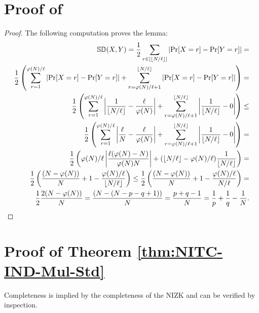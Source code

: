 \section{Proof of  }\label{proof:smpl-lemma}
\primelemma*


\begin{proof}
The following computation proves the lemma:
\begin{align*}
\mathbb{SD}(X, Y) = \frac{1}{2} \sum_{r \in [\left\lfloor N/\ell \right\rfloor]} \left| \Pr[X = r] - \Pr[Y = r] \right| = \\ 
\frac{1}{2} \left( \sum_{r = 1}^{\varphi(N)/\ell} \left| \Pr[X = r] - \Pr[Y = r] \right| + \sum_{r = \varphi(N)/\ell+1}^{\left\lfloor N/\ell \right\rfloor} \left| \Pr[X = r] - \Pr[Y = r] \right| \right) = 
\\
\frac{1}{2} \left( \sum_{r = 1}^{\varphi(N)/\ell} \left| \frac{1}{\left\lfloor N/\ell \right\rfloor} - \frac{\ell}{\varphi(N)} \right| + \sum_{r = \varphi(N)/\ell+1}^{\left\lfloor N/\ell \right\rfloor} \left| \frac{1}{\left\lfloor N/\ell \right\rfloor} - 0 \right| \right) \leq \\
\frac{1}{2} \left( \sum_{r = 1}^{\varphi(N)/\ell} \left| \frac{\ell}{N} - \frac{\ell}{\varphi(N)} \right| + \sum_{r = \varphi(N)/\ell+1}^{\left\lfloor N/\ell \right\rfloor} \left| \frac{1}{\left\lfloor N/\ell \right\rfloor} - 0 \right| \right) = \\
\frac{1}{2} \left( \varphi(N)/\ell \left| \frac{\ell(\varphi(N) - N)}{\varphi(N)N} \right| + (\left\lfloor N/\ell \right\rfloor-\varphi(N)/\ell) \frac{1}{\left\lfloor N/\ell \right\rfloor} \right) = \\
 \frac{1}{2} \left(\frac{(N-\varphi(N))}{N} + 1 - \frac{\varphi(N)/\ell}{{\left\lfloor N/\ell \right\rfloor}} \right) \leq 
\frac{1}{2} \left(\frac{(N-\varphi(N))}{N} + 1 - \frac{\varphi(N)/\ell}{{N/\ell}} \right) = \\
 \frac{1}{2}\frac{2(N-\varphi(N))}{N} = 
\frac{(N-(N-p-q+1))}{N} = \frac{p+q-1}{N} = \frac{1}{p}+\frac{1}{q}-\frac{1}{N}.
\end{align*}
\end{proof}



\section{Proof of Theorem \ref{thm:NITC-IND-Mul-Std}} %
\label{app:NITC-IND-Mul-Std}


Completeness is implied by the completeness of the NIZK and can be verified by inspection. 



